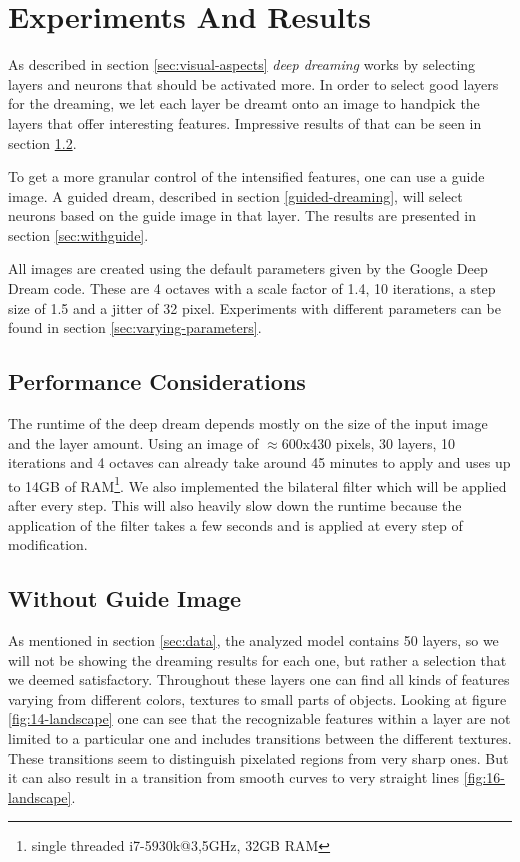 \section{Experiments And Results}
\label{sec:evaluation}
As described in section \ref{sec:visual-aspects} \emph{deep dreaming} works by selecting layers and neurons that should be activated more.
In order to select good layers for the dreaming, we let each layer be dreamt onto an image to handpick the layers that offer interesting features.
Impressive results of that can be seen in section \ref{sec:withoutguide}.

To get a more granular control of the intensified features, one can use a guide image.
A guided dream, described in section \ref{guided-dreaming}, will select neurons based on the guide image in that layer.
The results are presented in section \ref{sec:withguide}.

All images are created using the default parameters given by the Google Deep Dream code.
These are 4 octaves with a scale factor of 1.4, 10 iterations, a step size of 1.5 and a jitter of 32 pixel.
Experiments with different parameters can be found in section \ref{sec:varying-parameters}.


\subsection{Performance Considerations}
\label{sec:performance}
The runtime of the deep dream depends mostly on the size of the input image and the layer amount.
Using an image of $\approx$600x430 pixels, 30 layers, 10 iterations and 4 octaves can already take around 45 minutes to apply and uses up to 14GB of RAM\footnote{single threaded i7-5930k@3,5GHz, 32GB RAM}.
We also implemented the bilateral filter which will be applied after every step.\cite{bilateral}
This will also heavily slow down the runtime because the application of the filter takes a few seconds and is applied at every step of modification.


\subsection{Without Guide Image}
\label{sec:withoutguide}

As mentioned in section \ref{sec:data}, the analyzed model contains 50 layers, so we will not be showing the dreaming results for each one, but rather a selection that we deemed satisfactory.
Throughout these layers one can find all kinds of features varying from different colors, textures to small parts of objects.
Looking at figure \ref{fig:14-landscape} one can see that the recognizable features within a layer are not limited to a particular one and includes transitions between the different textures.
These transitions seem to distinguish pixelated regions from very sharp ones.
But it can also result in a transition from smooth curves to very straight lines \ref{fig:16-landscape}.

